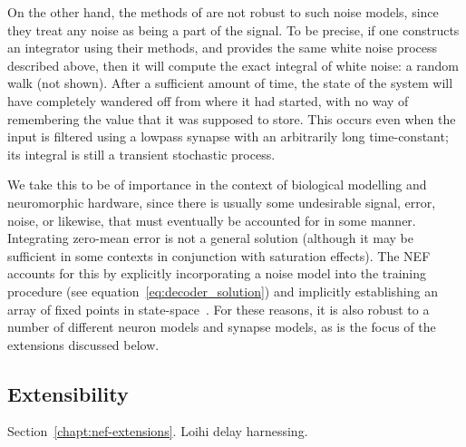 On the other hand, the methods of \citet{boerlin2013predictive} are not robust to such noise models, since they treat any noise as being a part of the signal.
To be precise, if one constructs an integrator using their methods, and provides the same white noise process described above, then it will compute the exact integral of white noise: a random walk (not shown).
After a sufficient amount of time, the state of the system will have completely wandered off from where it had started, with no way of remembering the value that it was supposed to store.
This occurs even when the input is filtered using a lowpass synapse with an arbitrarily long time-constant; its integral is still a transient stochastic process.

We take this to be of importance in the context of biological modelling and neuromorphic hardware, since there is usually some undesirable signal, error, noise, or likewise, that must eventually be accounted for in some manner.
Integrating zero-mean error is not a general solution (although it may be sufficient in some contexts in conjunction with saturation effects).
The NEF accounts for this by explicitly incorporating a noise model into the training procedure (see equation~\ref{eq:decoder_solution}) and implicitly establishing an array of fixed points in state-space~\citep[][p.~237]{eliasmith2003a}.
For these reasons, it is also robust to a number of different neuron models and synapse models, as is the focus of the extensions discussed below.

\subsection{Extensibility}
\label{sec:nef-extensibility}

Section~\ref{chapt:nef-extensions}. Loihi delay harnessing.
